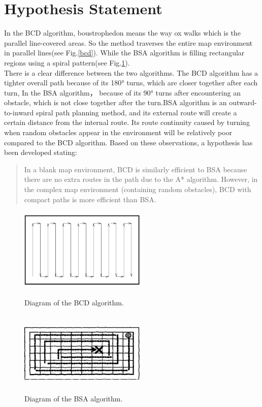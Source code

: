 \documentclass[conference]{IEEEtran}
\begin{document}
\section{Hypothesis Statement}
In the BCD algorithm, boustrophedon\cite{choset1998coverage} means the way ox walks which is the parallel line-covered areas. So the method traverses the entire map environment in parallel lines(see Fig.\ref{bcd}). While the BSA algorithm\cite{Gonzlez2003BSAAC} is filling rectangular regions using a spiral pattern(see Fig.\ref{bsa}).\\
There is a clear difference between the two algorithms. The BCD algorithm has a tighter overall path because of its 180° turns, which are closer together after each turn, In the BSA algorithm， because of its 90° turns after encountering an obstacle, which is not close together after the turn.BSA algorithm is an outward-to-inward spiral path planning method, and its external route will create a certain distance from the internal route. Its route continuity caused by turning when random obstacles appear in the environment will be relatively poor compared to the BCD algorithm.
Based on these observations, a hypothesis has been developed stating:
\begin{quote}
   In a blank map environment, BCD is similarly efficient to BSA because there are no extra routes in the path due to the A* algorithm. However, in the complex map environment (containing random obstacles), BCD with compact paths is more efficient than BSA.
\end{quote}

\begin{figure}[htbp]
\centering
\begin{minipage}[t]{0.48\textwidth}
\centering
\includegraphics[width=6cm,height=4cm]{RS_Report/bcd.png}
\caption{Diagram of the BCD algorithm\cite{choset1998coverage}. }
\label{bcd}
\end{minipage}
\begin{minipage}[t]{0.48\textwidth}
\centering
\includegraphics[width=6cm,height=4cm]{RS_Report/BSA.png}
\caption{Diagram of the BSA algorithm\cite{Gonzlez2003BSAAC}.}
\label{bsa}
\end{minipage}
\end{figure}
\end{document}
